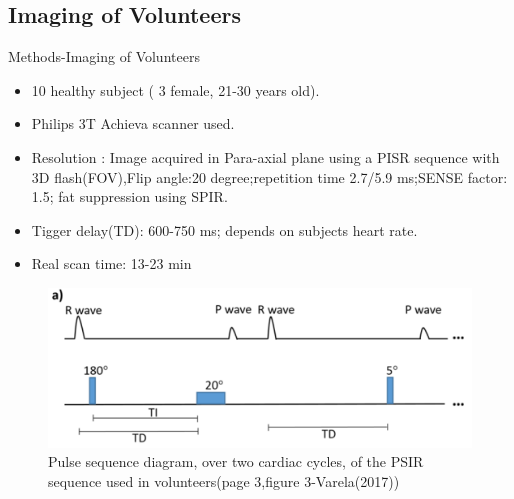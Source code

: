 \documentclass[aspectratio=43]{beamer}
\begin{document}
\subsection{Imaging of Volunteers}
\begin{frame}{Methods-Imaging of Volunteers}
\begin{minipage}{0.6\textwidth}\raggedleft
\begin{itemize}
        \item 10 healthy subject ( 3 female, 21-30 years old).
        \item Philips 3T Achieva scanner used. 
        \item Resolution : Image acquired in Para-axial plane using a PISR sequence with 3D flash(FOV),Flip angle:20 degree;repetition time 2.7/5.9 ms;SENSE factor: 1.5; fat suppression using SPIR.    
        \item Tigger delay(TD): 600-750 ms; depends on subjects heart rate.
        \item Real scan time: 13-23 min
\end{itemize}
\end{minipage}
\begin{minipage}{0.4\textwidth}\raggedleft
\begin{figure}


\includegraphics[width=\linewidth]{img/img1}

\caption {Pulse sequence diagram, over two cardiac cycles, of the PSIR sequence used in volunteers(page 3,figure 3-Varela(2017))}
\end{figure}
\end{minipage}

\noindent

\end{frame}

\newpage
\end{document}
